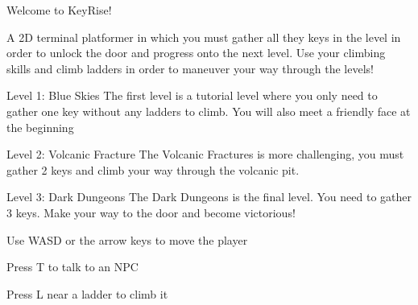 Welcome to Key\+Rise!

A 2D terminal platformer in which you must gather all they keys in the level in order to unlock the door and progress onto the next level. Use your climbing skills and climb ladders in order to maneuver your way through the levels!

Level 1\+: Blue Skies The first level is a tutorial level where you only need to gather one key without any ladders to climb. You will also meet a friendly face at the beginning

Level 2\+: Volcanic Fracture The Volcanic Fractures is more challenging, you must gather 2 keys and climb your way through the volcanic pit.

Level 3\+: Dark Dungeons The Dark Dungeons is the final level. You need to gather 3 keys. Make your way to the door and become victorious!

Use WASD or the arrow keys to move the player

Press T to talk to an NPC

Press L near a ladder to climb it 